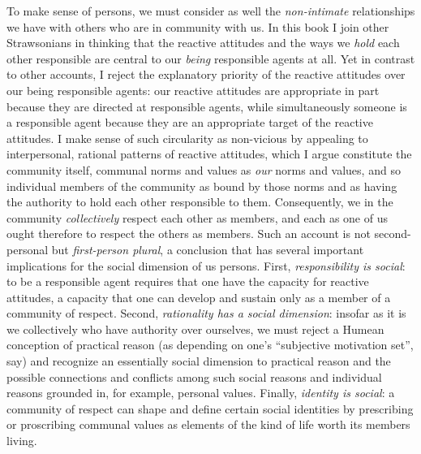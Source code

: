 \documentclass[%
  11pt,%
]{article}
\begin{document}
To make sense of persons, we must consider as well the \emph{non-intimate} relationships we have with others who are in community with us. In this book I join other Strawsonians in thinking that the reactive attitudes and the ways we \emph{hold} each other responsible are central to our \emph{being} responsible agents at all. Yet in contrast to other accounts, I reject the explanatory priority of the reactive attitudes over our being responsible agents: our reactive attitudes are appropriate in part because they are directed at responsible agents, while simultaneously someone is a responsible agent because they are an appropriate target of the reactive attitudes. I make sense of such circularity as non-vicious by appealing to interpersonal, rational patterns of reactive attitudes, which I argue constitute the community itself, communal norms and values as \emph{our} norms and values, and so individual members of the community as bound by those norms and as having the authority to hold each other responsible to them. Consequently, we in the community \emph{collectively} respect each other as members, and each as one of us ought therefore to respect the others as members. Such an account is not second-personal but \emph{first-person plural}, a conclusion that has several important implications for the social dimension of us persons. First, \emph{responsibility is social}: to be a responsible agent requires that one have the capacity for reactive attitudes, a capacity that one can develop and sustain only as a member of a community of respect. Second, \emph{rationality has a social dimension}: insofar as it is we collectively who have authority over ourselves, we must reject a Humean conception of practical reason (as depending on one's \enquote{subjective motivation set}, say) and recognize an essentially social dimension to practical reason and the possible connections and conflicts among such social reasons and individual reasons grounded in, for example, personal values. Finally, \emph{identity is social}: a community of respect can shape and define certain social identities by prescribing or proscribing communal values as elements of the kind of life worth its members living.

\ifdefined\HCode
  \subsubsection*{}%
\fi
\end{document}

